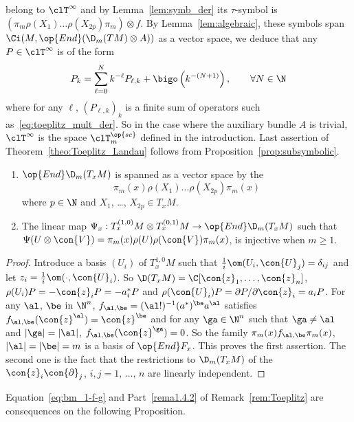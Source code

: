 belong to $\clT^{\infty}$ and  by Lemma~\ref{lem:symb_der}  its $\tau$-symbol is $ (\pi_m \rho(X_1) \ldots
\rho(X_{2p})\pi_m) \otimes f $. By Lemma~\ref{lem:algebraic}, these symbols span $\Ci (M,
\op{End} (\D_m (TM) \otimes A))$ as a vector space, we deduce that any $P \in \clT^{\infty}$ is of the form
\[
P_k = \sum_{\ell =0 }^N k^{-\ell} P_{\ell,k} + \bigo \left(k^{-(N+1)}\right), \qquad
\forall N \in \N
\]
where for any $\ell$, $(P_{\ell,k})_k$ is a finite sum of operators such as~\eqref{eq:toeplitz_mult_der}. So in the case where the auxiliary bundle $A$ is trivial, $\clT^{\infty}$ is the space $\clT^{\op{sc}}_m$ defined in the introduction. Last assertion of Theorem~\ref{theo:Toeplitz_Landau} follows from Proposition~\ref{prop:subsymbolic}.

\begin{lemm}\label{lem:algebraic}\leavevmode
\begin{enumerate}
\item\label{lemm6.8.1} $\op{End} \D_m(T_xM)$ is spanned as a vector space by the
\[
\pi_m (x) \rho (X_1) \ldots \rho (X_{2p}) \pi_m (x)
\]
where $p \in \N$ and $X_1$,
\ldots, $X_{2p} \in T_xM$.
\item\label{lemm6.8.2} The linear map $\Psi_x : T^{(1,0)} _xM \otimes T^{(0,1)} _xM \rightarrow \op{End} \D_m (T_xM)$ such that $\Psi (U \otimes
\con{V})= \pi_m (x) \rho (U)
\rho (\con{V}) \pi_m (x)$, is injective when $m \geqslant 1$.
\end{enumerate}
\end{lemm}

\begin{proof}
Introduce a
basis $(U_i)$ of $T^{1,0}_xM$ such that $\frac{1}{i} \om (U_i, \con {U}_j) = \delta_{ij}$ and let $z_i = \frac{1}{i} \om (\cdot,\con{U}_i)$. So $ \D (T_x M) = \C [\con{z}_1, \ldots, \con{z}_n]$, $\rho (U_i) P = - \con{z}_i P = - a_i^* P$ and $ \rho (\con{U}_i) P = \partial P / \partial
\con{z}_i = a_i P$. For any $\al $, $\be$ in $\N^n$, $f_{\al, \be}= (\al!)^{-1} (a^*)^{\be} a^\al$ satisfies $f_{\al,\be} (\con{z}^\al) =
\con{z}^\be$ and for any $\ga \in \N^n$ such that $\ga \neq \al$ and $| \ga | = |
\al |$, $f_{\al,\be} (\con{z}^\ga) = 0$. So the family $\pi_m(x) f_{\al, \be}
\pi_m (x)$, $| \al | = | \be | =m$ is a basis of $\op{End} F_x$. This proves the first assertion. The second one is the fact that the restrictions to $\D_m (T_xM)$ of the $ \con{z}_i \con{\partial}_j$, $i, j =1,\, \ldots,\, n$ are linearly independent.
\end{proof}


Equation~\eqref{eq:bm_1-f-g} and Part~\eqref{rema1.4.2} of Remark~\ref{rem:Toeplitz} are consequences on the following Proposition.

